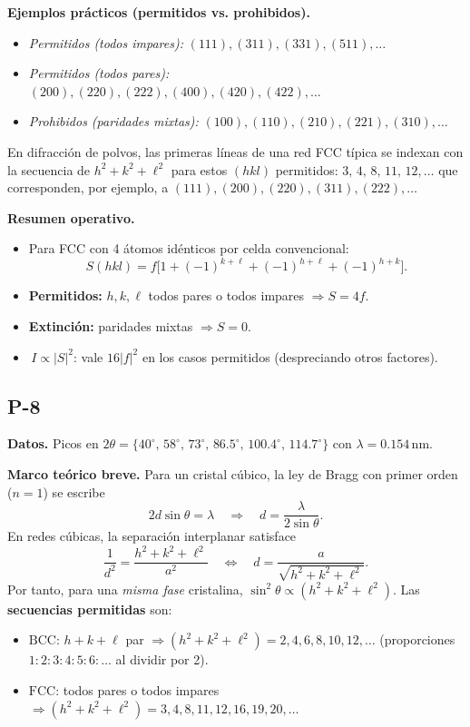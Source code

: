 \documentclass{article}
\begin{document}
\medskip
\textbf{Ejemplos prácticos (permitidos vs. prohibidos).}
\begin{itemize}
\item \emph{Permitidos (todos impares):} \((111),(311),(331),(511),\dots\)
\item \emph{Permitidos (todos pares):} \((200),(220),(222),(400),(420),(422),\dots\)
\item \emph{Prohibidos (paridades mixtas):} \((100),(110),(210),(221),(310),\dots\)
\end{itemize}
En difracción de polvos, las primeras líneas de una red FCC típica se indexan con la secuencia de \(h^2+k^2+\ell^2\) para estos \((hkl)\) permitidos: \(3,\,4,\,8,\,11,\,12,\dots\) que corresponden, por ejemplo, a \((111),(200),(220),(311),(222),\dots\)

\medskip
\textbf{Resumen operativo.}
\begin{itemize}
\item Para FCC con 4 átomos idénticos por celda convencional:
\[
S(hkl)=
f\Big[1+(-1)^{k+\ell}+(-1)^{h+\ell}+(-1)^{h+k}\Big].
\]
\item \textbf{Permitidos:} \(h,k,\ell\) todos pares o todos impares \(\Rightarrow S=4f\).
\item \textbf{Extinción:} paridades mixtas \(\Rightarrow S=0\).
\item \(\,I\propto |S|^2\): vale \(16|f|^2\) en los casos permitidos (despreciando otros factores).
\end{itemize}


\subsection{P-8}

\textbf{Datos.}  
Picos en \(2\theta=\{40^\circ,\,58^\circ,\,73^\circ,\,86.5^\circ,\,100.4^\circ,\,114.7^\circ\}\) con \(\lambda=0.154\,\mathrm{nm}\).

\medskip
\textbf{Marco teórico breve.}  
Para un cristal cúbico, la ley de Bragg con primer orden (\(n=1\)) se escribe
\[
2d\sin\theta=\lambda \quad\Rightarrow\quad d=\frac{\lambda}{2\sin\theta}.
\]
En redes cúbicas, la separación interplanar satisface
\[
\frac{1}{d^2}=\frac{h^2+k^2+\ell^2}{a^2}
\quad\Longleftrightarrow\quad
d=\frac{a}{\sqrt{h^2+k^2+\ell^2}}.
\]
Por tanto, para una \emph{misma fase} cristalina, \( \sin^2\theta \propto (h^2+k^2+\ell^2)\).  
Las \textbf{secuencias permitidas} son:
\begin{itemize}
\item \(\mathrm{BCC}\): \(h+k+\ell\) par \(\Rightarrow (h^2{+}k^2{+}\ell^2)=2,4,6,8,10,12,\dots\) (proporciones \(1{:}2{:}3{:}4{:}5{:}6:\dots\) al dividir por 2).
\item \(\mathrm{FCC}\): todos pares o todos impares \(\Rightarrow (h^2{+}k^2{+}\ell^2)=3,4,8,11,12,16,19,20,\dots\)
\end{itemize}
\end{document}
